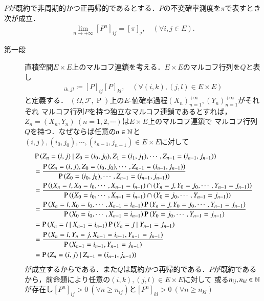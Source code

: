 	\begin{thm}[エルゴード性]
		$P$が既約で非周期的かつ正再帰的であるとする．$P$の不変確率測度を$\pi$で表すとき次が成立．
		\begin{align}
			\lim_{n \to +\infty}[P^n]_{ij} = [\pi]_j, \quad (\forall i,j \in E).
		\end{align}
	\end{thm}
	\begin{prf}\mbox{}
	\begin{description}
	\item[第一段]
		直積空間$E \times E$上のマルコフ連鎖を考える．$E \times E$のマルコフ行列を$Q$と表し
		\begin{align}
			[Q]_{ik,jl} \coloneqq [P]_{ij}[P]_{kl}, \quad (\forall (i,k), (j,l) \in E \times E)
		\end{align}
		と定義する．
		$(\Omega,\mathcal{F},\operatorname{P})$上の$E$-値確率過程$(X_n)_{n=1}^{+\infty}, (Y_n)_{n=1}^{+\infty}$がそれぞれ
		マルコフ行列$P$を持つ独立なマルコフ連鎖であるとすれば，$Z_n=(X_n,Y_n)\ (n=1,2,\cdots)$は$E \times E$上のマルコフ連鎖で
		マルコフ行列$Q$を持つ．なぜならば任意の$n \in \mathbb{N}$と$(i,j),(i_0,j_0),\cdots,(i_{n-1},j_{n-1}) \in E \times E$に対して
		\begin{align}
			&\operatorname{P} \left( Z_n = (i,j) \ \middle|\ Z_0=(i_0,j_0),Z_1=(i_1,j_1), \cdots, Z_{n-1} = (i_{n-1},j_{n-1}) \right) \\
			&= \frac{\operatorname{P} \left(Z_n = (i,j), Z_0=(i_0,j_0),\cdots, Z_{n-1} = (i_{n-1},j_{n-1})\right)}{\operatorname{P} \left(Z_0=(i_0,j_0),\cdots, Z_{n-1} = (i_{n-1},j_{n-1})\right)} \\
			&= \frac{\operatorname{P} \left((X_n=i,X_0=i_0,\cdots, X_{n-1} = i_{n-1})\cap(Y_n=j,Y_0=j_0,\cdots, Y_{n-1}=j_{n-1})\right)}{\operatorname{P} \left((X_0=i_0,\cdots, X_{n-1} = i_{n-1})\cap(Y_0=j_0,\cdots, Y_{n-1}=j_{n-1})\right)} \\
			&= \frac{\operatorname{P} \left(X_n=i,X_0=i_0,\cdots, X_{n-1} = i_{n-1}\right)\operatorname{P} \left(Y_n=j,Y_0=j_0,\cdots, Y_{n-1}=j_{n-1}\right)}{\operatorname{P} \left(X_0=i_0,\cdots, X_{n-1}=i_{n-1}\right)\operatorname{P} \left(Y_0=j_0,\cdots, Y_{n-1}=j_{n-1}\right)} \\
			&= \operatorname{P} \left( X_n = i \ \middle|\ X_{n-1}=i_{n-1} \right)\operatorname{P} \left( Y_n = j \ \middle|\ Y_{n-1}=j_{n-1} \right) \label{eq:ergodic_discrete_1}\\
			&= \frac{\operatorname{P} \left(X_n=i,Y_n=j,X_{n-1}=i_{n-1},Y_{n-1}=j_{n-1}\right)}{\operatorname{P} \left(X_{n-1}=i_{n-1},Y_{n-1}=j_{n-1}\right)} \\
			&= \operatorname{P} \left( Z_n=(i,j) \ \middle|\ Z_{n-1}=(i_{n-1},j_{n-1}) \right)
		\end{align}
		が成立するからである．また$Q$は既約かつ再帰的である．$P$が既約であるから，前命題により任意の$(i,k),(j,l) \in E \times E$に対して
		或る$n_{ij},n_{kl} \in \mathbb{N}$が存在し$[P^n]_{ij} > 0\ (\forall n \geq n_{ij})$と$[P^n]_{kl} > 0\ (\forall n \geq n_{kl})$

\end{description}
\end{prf}
